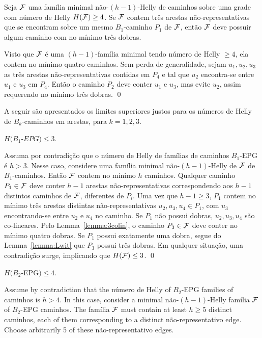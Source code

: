 \begin{lemma} \label{lemma:Lwit}
Seja $\cal{F}$ uma família minimal não-$(h-1)$-Helly de caminhos sobre uma grade com  número de Helly $H({\cal F}) \geq 4$. Se  ${\cal F}$ contem três arestas  não-representativas que se encontram sobre um mesmo $B_1$-caminho  $P_1$ de $\cal{F}$, então $\cal {F}$ deve possuir algum caminho com no mínimo três dobras. \end{lemma}

\proof
Visto que $\cal{F}$ é uma  $(h-1)$-família minimal tendo  número de Helly $\geq 4$, ela contem no mínimo quatro caminhos. Sem perda de generalidade, sejam  $u_1, u_2, u_3$ as três arestas não-representativas contidas em $P_4$ e tal que  $u_2$ encontra-se entre $u_1$ e $u_3$ em $P_4$. Então o caminho $P_2$ deve conter $u_1$ e $u_3$, mas evite $u_2$, assim requerendo no mínimo três dobras.  
\qed

A seguir são apresentados os limites superiores justos para os números de Helly de $B_k$-caminhos em arestas, para $k = 1,2,3$.

\begin{lema}\label{claim:upper-B1}
$H(B_1$-$EPG) \leq 3.$
\end{lema}
 
\proof
Assuma por contradição que o número de Helly de famílias de caminhos $B_1$-EPG é $h > 3$. Nesse caso, considere uma família minimal não-$(h-1)$-Helly de $\cal F$ de $B_1$-caminhos. Então $\cal F$ contem no mínimo  $h$ caminhos.  
Qualquer caminho $P_1 \in \cal{F}$ deve conter $h-1$ arestas não-representativas  correspondendo aos $h-1$ distintos caminhos de $\cal F$, diferentes de $P_i$. Uma vez que $h-1 \geq 3$, $P_1$  contem no mínimo três arestas  distintas não-representativas $u_2, u_3, u_4 \in P_1$, com $u_3$ encontrando-se entre $u_2$ e $u_4$ no caminho.  Se $P_1$ não possui dobras, $u_2,u_3,u_4$ são co-lineares. Pelo Lemma~\ref{lemma:3colin},  o caminho $P_3 \in \cal{F}$ deve conter no mínimo quatro dobras. Se $P_1$ possui exatamente uma dobra, segue do Lemma~\ref{lemma:Lwit} que $P_3$ possui três dobras. Em qualquer situação, uma contradição surge, implicando que $H({\cal F}) \leq 3$.
\qed

\begin{lema}\label{claim:upper-B2}
$H(B_2$-EPG$) \leq 4.$
\end{lema}

\proof
Assume by contradiction that the número de Helly of  $B_2$-EPG families of caminhos is $h > 4$. In this case, consider a minimal não-$(h-1)$-Helly família $\cal F$ of $B_2$-EPG caminhos. The família  $\cal F$ must contain at least $h \geq 5$ distinct caminhos, each of them corresponding to a distinct não-representativo  edge. Choose arbitrarily 5 of these não-representativo edges.

